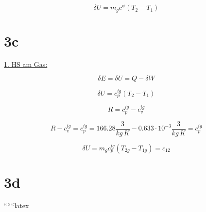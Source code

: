 \[
\delta U = m_g c^{\psi} (T_2 - T_1)
\]

\section*{3c}

\underline{1. HS am Gas:}

\[
\delta E = \delta U = Q - \delta W
\]

\[
\delta U = c_p^{ig} (T_2 - T_1)
\]

\[
R = c_p^{ig} - c_v^{ig}
\]

\[
R - c_v^{ig} = c_p^{ig} = 166.28 \frac{3}{kg \, K} - 0.633 \cdot 10^{-3} \frac{3}{kg \, K} = c_p^{ig}
\]

\[
\delta U = m_g c_p^{ig} (T_{2g} - T_{1g}) = c_{12}
\]

\section*{3d}

``````latex


